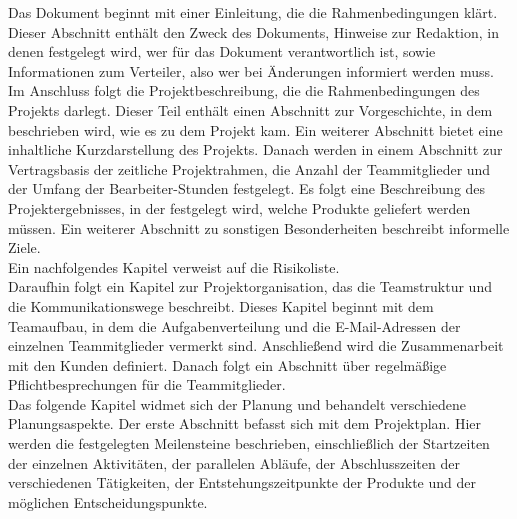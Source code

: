 Das Dokument beginnt mit einer Einleitung, die die Rahmenbedingungen klärt. Dieser Abschnitt enthält den Zweck des 
Dokuments, Hinweise zur Redaktion, in denen festgelegt wird, wer für das Dokument verantwortlich ist, sowie 
Informationen zum Verteiler, also wer bei Änderungen informiert werden muss.\\

Im Anschluss folgt die Projektbeschreibung, die die Rahmenbedingungen des Projekts darlegt. Dieser Teil enthält einen 
Abschnitt zur Vorgeschichte, in dem beschrieben wird, wie es zu dem Projekt kam. Ein weiterer Abschnitt bietet eine 
inhaltliche Kurzdarstellung des Projekts. Danach werden in einem Abschnitt zur Vertragsbasis der zeitliche 
Projektrahmen, die Anzahl der Teammitglieder und der Umfang der Bearbeiter-Stunden festgelegt. Es folgt eine 
Beschreibung des Projektergebnisses, in der festgelegt wird, welche Produkte geliefert werden müssen. Ein weiterer 
Abschnitt zu sonstigen Besonderheiten beschreibt informelle Ziele.\\

Ein nachfolgendes Kapitel verweist auf die Risikoliste.\\

Daraufhin folgt ein Kapitel zur Projektorganisation, das die Teamstruktur und die Kommunikationswege beschreibt. 
Dieses Kapitel beginnt mit dem Teamaufbau, in dem die Aufgabenverteilung und die E-Mail-Adressen der einzelnen 
Teammitglieder vermerkt sind. Anschließend wird die Zusammenarbeit mit den Kunden definiert. Danach folgt ein 
Abschnitt über regelmäßige Pflichtbesprechungen für die Teammitglieder.\\ %

Das folgende Kapitel widmet sich der Planung und behandelt verschiedene Planungsaspekte. Der erste Abschnitt befasst 
sich mit dem Projektplan. Hier werden die festgelegten Meilensteine beschrieben, einschließlich der Startzeiten der 
einzelnen Aktivitäten, der parallelen Abläufe, der Abschlusszeiten der verschiedenen Tätigkeiten, der 
Entstehungszeitpunkte der Produkte und der möglichen Entscheidungspunkte.\\ %

